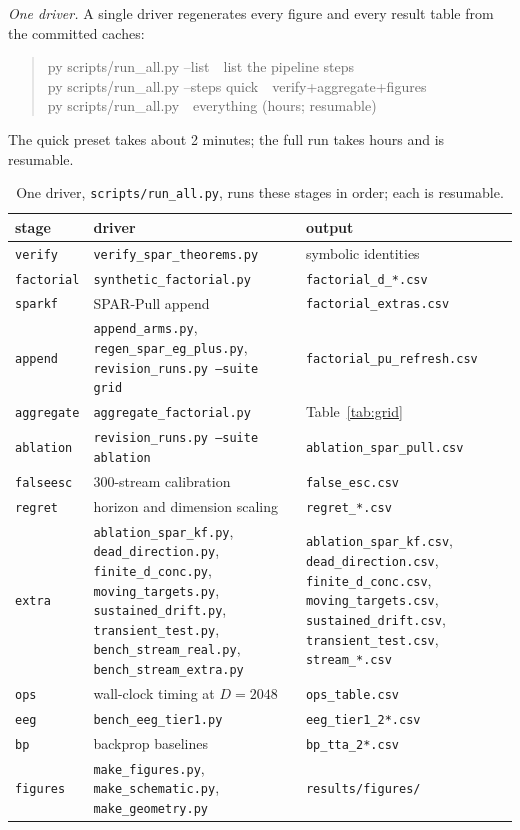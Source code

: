 \documentclass[11pt]{article}
\begin{document}
\emph{One driver.}
A single driver regenerates every figure and every result table from the committed caches:
\begin{quote}
\ttfamily
py scripts/run\_all.py --list\ \ list the pipeline steps\\
py scripts/run\_all.py --steps quick\ \ verify+aggregate+figures\\
py scripts/run\_all.py\ \ everything (hours; resumable)
\end{quote}
The quick preset takes about 2 minutes; the full run takes hours and is resumable.
\begin{table}[!htbp]
\centering
\footnotesize
\setlength{\tabcolsep}{4pt}
\caption{One driver, \texttt{scripts/run\_all.py}, runs these stages in order; each is resumable.}
\label{tab:pipeline}
\begin{tabular}{@{}p{0.72in}p{2.95in}p{1.55in}@{}}
\toprule
stage & driver & output \\
\midrule
\texttt{verify} & \texttt{verify\_spar\_theorems.py} & symbolic identities \\
\texttt{factorial} & \texttt{synthetic\_factorial.py} & \texttt{factorial\_d\_*.csv} \\
\texttt{sparkf} & SPAR-Pull append & \texttt{factorial\_extras.csv} \\
\texttt{append} & \texttt{append\_arms.py}, \texttt{regen\_spar\_eg\_plus.py}, \texttt{revision\_runs.py --suite grid} & \texttt{factorial\_pu\_refresh.csv} \\
\texttt{aggregate} & \texttt{aggregate\_factorial.py} & Table~\ref{tab:grid} \\
\texttt{ablation} & \texttt{revision\_runs.py --suite ablation} & \texttt{ablation\_spar\_pull.csv} \\
\texttt{falseesc} & 300-stream calibration & \texttt{false\_esc.csv} \\
\texttt{regret} & horizon and dimension scaling & \texttt{regret\_*.csv} \\
\texttt{extra} & \texttt{ablation\_spar\_kf.py}, \texttt{dead\_direction.py}, \texttt{finite\_d\_conc.py}, \texttt{moving\_targets.py}, \texttt{sustained\_drift.py}, \texttt{transient\_test.py}, \texttt{bench\_stream\_real.py}, \texttt{bench\_stream\_extra.py} & \texttt{ablation\_spar\_kf.csv}, \texttt{dead\_direction.csv}, \texttt{finite\_d\_conc.csv}, \texttt{moving\_targets.csv}, \texttt{sustained\_drift.csv}, \texttt{transient\_test.csv}, \texttt{stream\_*.csv} \\
\texttt{ops} & wall-clock timing at $D=2048$ & \texttt{ops\_table.csv} \\
\texttt{eeg} & \texttt{bench\_eeg\_tier1.py} & \texttt{eeg\_tier1\_2*.csv} \\
\texttt{bp} & backprop baselines & \texttt{bp\_tta\_2*.csv} \\
\texttt{figures} & \texttt{make\_figures.py}, \texttt{make\_schematic.py}, \texttt{make\_geometry.py} & \texttt{results/figures/} \\
\bottomrule
\end{tabular}
\end{table}
\end{document}
